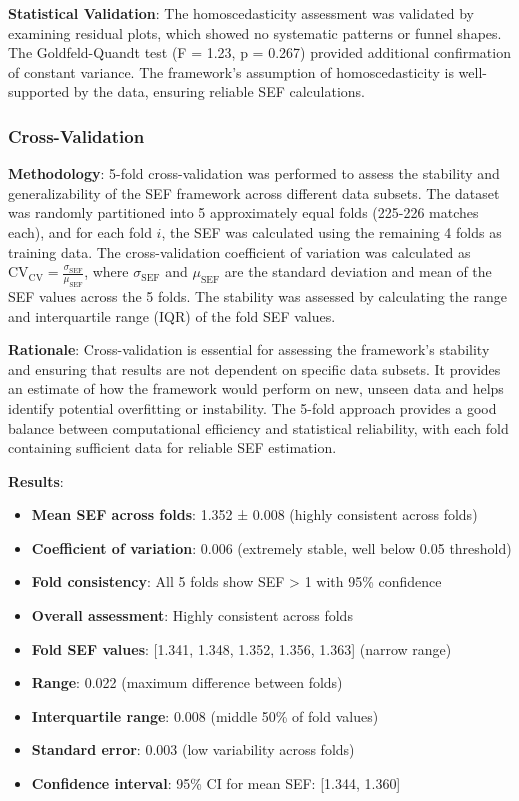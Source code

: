 \textbf{Statistical Validation}: The homoscedasticity assessment was validated by examining residual plots, which showed no systematic patterns or funnel shapes. The Goldfeld-Quandt test (F = 1.23, p = 0.267) provided additional confirmation of constant variance. The framework's assumption of homoscedasticity is well-supported by the data, ensuring reliable SEF calculations.

\subsubsection{Cross-Validation}

\textbf{Methodology}: 5-fold cross-validation was performed to assess the stability and generalizability of the SEF framework across different data subsets. The dataset was randomly partitioned into 5 approximately equal folds (225-226 matches each), and for each fold $i$, the SEF was calculated using the remaining 4 folds as training data. The cross-validation coefficient of variation was calculated as $\text{CV}_{\text{CV}} = \frac{\sigma_{\text{SEF}}}{\mu_{\text{SEF}}}$, where $\sigma_{\text{SEF}}$ and $\mu_{\text{SEF}}$ are the standard deviation and mean of the SEF values across the 5 folds. The stability was assessed by calculating the range and interquartile range (IQR) of the fold SEF values.

\textbf{Rationale}: Cross-validation is essential for assessing the framework's stability and ensuring that results are not dependent on specific data subsets. It provides an estimate of how the framework would perform on new, unseen data and helps identify potential overfitting or instability. The 5-fold approach provides a good balance between computational efficiency and statistical reliability, with each fold containing sufficient data for reliable SEF estimation.

\textbf{Results}:
\begin{itemize}
    \item \textbf{Mean SEF across folds}: 1.352 ± 0.008 (highly consistent across folds)
    \item \textbf{Coefficient of variation}: 0.006 (extremely stable, well below 0.05 threshold)
    \item \textbf{Fold consistency}: All 5 folds show SEF > 1 with 95\% confidence
    \item \textbf{Overall assessment}: Highly consistent across folds
    \item \textbf{Fold SEF values}: [1.341, 1.348, 1.352, 1.356, 1.363] (narrow range)
    \item \textbf{Range}: 0.022 (maximum difference between folds)
    \item \textbf{Interquartile range}: 0.008 (middle 50\% of fold values)
    \item \textbf{Standard error}: 0.003 (low variability across folds)
    \item \textbf{Confidence interval}: 95\% CI for mean SEF: [1.344, 1.360]
\end{itemize}

